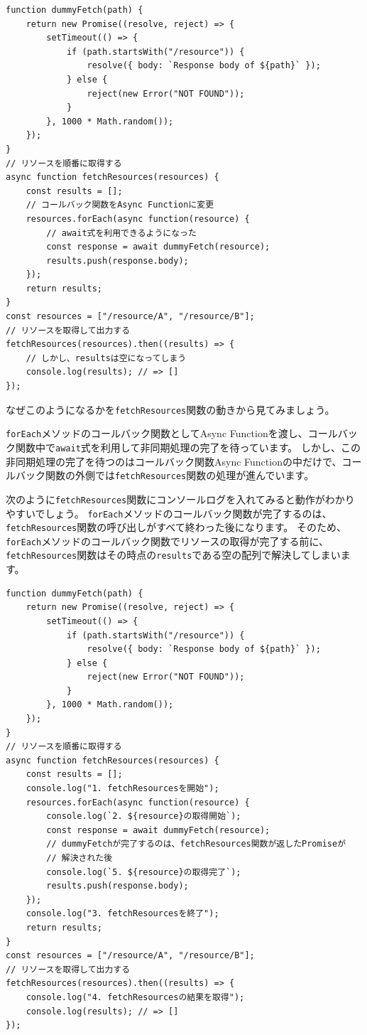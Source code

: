 \begin{lstlisting}
function dummyFetch(path) {
    return new Promise((resolve, reject) => {
        setTimeout(() => {
            if (path.startsWith("/resource")) {
                resolve({ body: `Response body of ${path}` });
            } else {
                reject(new Error("NOT FOUND"));
            }
        }, 1000 * Math.random());
    });
}
// リソースを順番に取得する
async function fetchResources(resources) {
    const results = [];
    // コールバック関数をAsync Functionに変更
    resources.forEach(async function(resource) {
        // await式を利用できるようになった
        const response = await dummyFetch(resource);
        results.push(response.body);
    });
    return results;
}
const resources = ["/resource/A", "/resource/B"];
// リソースを取得して出力する
fetchResources(resources).then((results) => {
    // しかし、resultsは空になってしまう
    console.log(results); // => []
});
\end{lstlisting}

なぜこのようになるかを\texttt{fetchResources}関数の動きから見てみましょう。

\texttt{forEach}メソッドのコールバック関数としてAsync
Functionを渡し、コールバック関数中で\texttt{await}式を利用して非同期処理の完了を待っています。
しかし、この非同期処理の完了を待つのはコールバック関数Async
Functionの中だけで、コールバック関数の外側では\texttt{fetchResources}関数の処理が進んでいます。

次のように\texttt{fetchResources}関数にコンソールログを入れてみると動作がわかりやすいでしょう。
\texttt{forEach}メソッドのコールバック関数が完了するのは、\texttt{fetchResources}関数の呼び出しがすべて終わった後になります。
そのため、\texttt{forEach}メソッドのコールバック関数でリソースの取得が完了する前に、\texttt{fetchResources}関数はその時点の\texttt{results}である空の配列で解決してしまいます。

\begin{lstlisting}
function dummyFetch(path) {
    return new Promise((resolve, reject) => {
        setTimeout(() => {
            if (path.startsWith("/resource")) {
                resolve({ body: `Response body of ${path}` });
            } else {
                reject(new Error("NOT FOUND"));
            }
        }, 1000 * Math.random());
    });
}
// リソースを順番に取得する
async function fetchResources(resources) {
    const results = [];
    console.log("1. fetchResourcesを開始");
    resources.forEach(async function(resource) {
        console.log(`2. ${resource}の取得開始`);
        const response = await dummyFetch(resource);
        // dummyFetchが完了するのは、fetchResources関数が返したPromiseが
        // 解決された後
        console.log(`5. ${resource}の取得完了`);
        results.push(response.body);
    });
    console.log("3. fetchResourcesを終了");
    return results;
}
const resources = ["/resource/A", "/resource/B"];
// リソースを取得して出力する
fetchResources(resources).then((results) => {
    console.log("4. fetchResourcesの結果を取得");
    console.log(results); // => []
});
\end{lstlisting}

